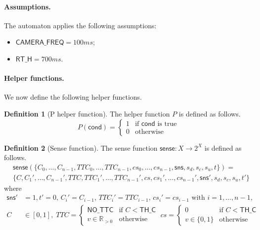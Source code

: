\documentclass[12pt]{article}
\theoremstyle{definition}
\newtheorem{definition}{Definition}[section]
\begin{document}
\paragraph{Assumptions.} The automaton applies the following assumptions:
\begin{itemize}
    \item $\mathsf{CAMERA\_FREQ} = 100ms$;
    \item $\mathsf{RT\_H} = 700ms$.
\end{itemize}

\paragraph{Helper functions.} We now define the following helper functions.
\begin{definition}[P helper function]
    The helper function $P$ is defined as follows.
\[
    P(\mathsf{cond}) =
    \begin{cases}
        1 & \text{if } \mathsf{cond} \text{ is true} \\
        0 & \text{otherwise}
    \end{cases}
\]
\end{definition}


\begin{definition}[Sense function]
The sense function $\mathsf{sense}: X \to 2^X$ is defined as follows.
    \[
    \begin{aligned}
        &\mathsf{sense}(\{C_0, \ldots, C_{n-1}, TTC_0, \ldots, TTC_{n-1}, cs_0, \ldots, cs_{n-1}, \mathsf{sns}, s_d, s_c, s_u, t\}) = \\
        &\{C, C_1', \ldots, C_{n-1}', TTC, TTC_1', \ldots, TTC_{n-1}', cs, cs_1', \ldots, cs_{n-1}',  \mathsf{sns}', s_d, s_c, s_u, t'\}
    \end{aligned}
\]
where
\[
    \begin{aligned}
     \mathsf{sns}' &= 1, t' = 0, \, C_i' = C_{i-1}, \, TTC_i' = TTC_{i-1}, \, cs_i' = cs_{i-1} \text{ with } i = 1, \dots, n-1, \\ 
    C &\in [0,1], \;
    TTC =     
    \begin{cases}
        \mathsf{NO\_TTC} & \text{if } C < \mathsf{TH\_C} \\
        v \in \mathbb{R}_{>0} & \text{otherwise}
    \end{cases} \;
    cs =     
    \begin{cases}
        0 & \text{if } C < \mathsf{TH\_C} \\
        v \in \{0,1\} & \text{otherwise}
    \end{cases} 
    \end{aligned}
\]
\end{definition}
\end{document}
